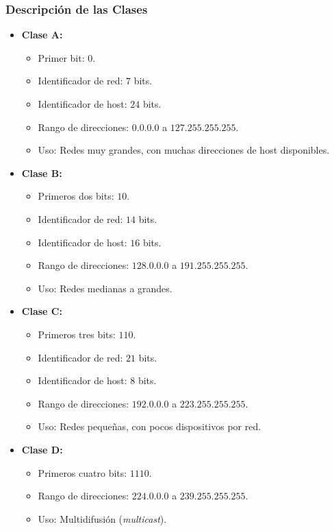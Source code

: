 \documentclass[a4paper,12pt]{article}
\begin{document}
\subsubsection*{Descripción de las Clases}
\begin{itemize}
    \item \textbf{Clase A:}
    \begin{itemize}
        \item Primer bit: \(0\).
        \item Identificador de red: \(7\) bits.
        \item Identificador de host: \(24\) bits.
        \item Rango de direcciones: \(0.0.0.0\) a \(127.255.255.255\).
        \item Uso: Redes muy grandes, con muchas direcciones de host disponibles.
    \end{itemize}

    \item \textbf{Clase B:}
    \begin{itemize}
        \item Primeros dos bits: \(10\).
        \item Identificador de red: \(14\) bits.
        \item Identificador de host: \(16\) bits.
        \item Rango de direcciones: \(128.0.0.0\) a \(191.255.255.255\).
        \item Uso: Redes medianas a grandes.
    \end{itemize}

    \item \textbf{Clase C:}
    \begin{itemize}
        \item Primeros tres bits: \(110\).
        \item Identificador de red: \(21\) bits.
        \item Identificador de host: \(8\) bits.
        \item Rango de direcciones: \(192.0.0.0\) a \(223.255.255.255\).
        \item Uso: Redes pequeñas, con pocos dispositivos por red.
    \end{itemize}

    \item \textbf{Clase D:}
    \begin{itemize}
        \item Primeros cuatro bits: \(1110\).
        \item Rango de direcciones: \(224.0.0.0\) a \(239.255.255.255\).
        \item Uso: Multidifusión (\textit{multicast}).
    \end{itemize}


\end{itemize}
\end{document}
